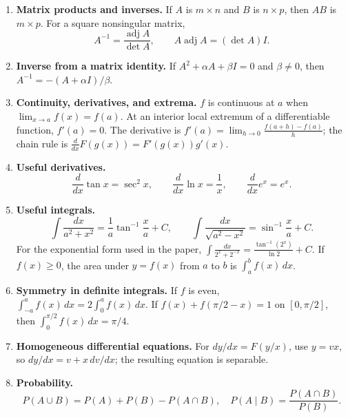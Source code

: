 \begin{enumerate}[label=\textbf{1.1.\arabic*.},ref=1.1.\arabic*]
\setlength{\itemsep}{0.35em}
\item \label{formula-1-1-1} \textbf{Matrix products and inverses.} If $A$ is $m\times n$ and $B$ is $n\times p$, then $AB$ is $m\times p$. For a square nonsingular matrix,
\begin{equation*}\tag{1.1.1.1}
A^{-1}=\frac{\operatorname{adj}A}{\det A},\qquad A\operatorname{adj}A=(\det A)I.
\end{equation*}
\item \label{formula-1-1-2} \textbf{Inverse from a matrix identity.} If $A^2+\alpha A+\beta I=0$ and $\beta\ne0$, then $A^{-1}=-(A+\alpha I)/\beta$.
\item \label{formula-1-1-3} \textbf{Continuity, derivatives, and extrema.} $f$ is continuous at $a$ when $\lim_{x\to a}f(x)=f(a)$. At an interior local extremum of a differentiable function, $f\prime(a)=0$. The derivative is $f'(a)=\lim_{h\to0}\frac{f(a+h)-f(a)}h$; the chain rule is $\frac{d}{dx}F(g(x))=F'(g(x))g'(x)$.
\item \label{formula-1-1-4} \textbf{Useful derivatives.}
\begin{equation*}\tag{1.1.4.1}
\frac{d}{dx}\tan x=\sec^2x,\qquad
\frac{d}{dx}\ln x=\frac1x,\qquad
\frac{d}{dx}e^x=e^x.
\end{equation*}
\item \label{formula-1-1-5} \textbf{Useful integrals.}
\begin{equation*}\tag{1.1.5.1}
\int\frac{dx}{a^2+x^2}=\frac1a\tan^{-1}\!\frac xa+C,\qquad
\int\frac{dx}{\sqrt{a^2-x^2}}=\sin^{-1}\!\frac xa+C.
\end{equation*}
For the exponential form used in the paper, $\int\frac{dx}{2^x+2^{-x}}=\frac{\tan^{-1}(2^x)}{\ln2}+C$. If $f(x)\ge0$, the area under $y=f(x)$ from $a$ to $b$ is $\int_a^b f(x)\,dx$.
\item \label{formula-1-1-6} \textbf{Symmetry in definite integrals.} If $f$ is even, $\int_{-a}^{a}f(x)\,dx=2\int_0^a f(x)\,dx$. If $f(x)+f(\pi/2-x)=1$ on $[0,\pi/2]$, then $\int_0^{\pi/2}f(x)\,dx=\pi/4$.
\item \label{formula-1-1-7} \textbf{Homogeneous differential equations.} For $dy/dx=F(y/x)$, use $y=vx$, so $dy/dx=v+x\,dv/dx$; the resulting equation is separable.
\item \label{formula-1-1-8} \textbf{Probability.}
\begin{equation*}\tag{1.1.8.1}
P(A\cup B)=P(A)+P(B)-P(A\cap B),\quad
P(A\mid B)=\frac{P(A\cap B)}{P(B)}.

\end{equation*}
\end{enumerate}
